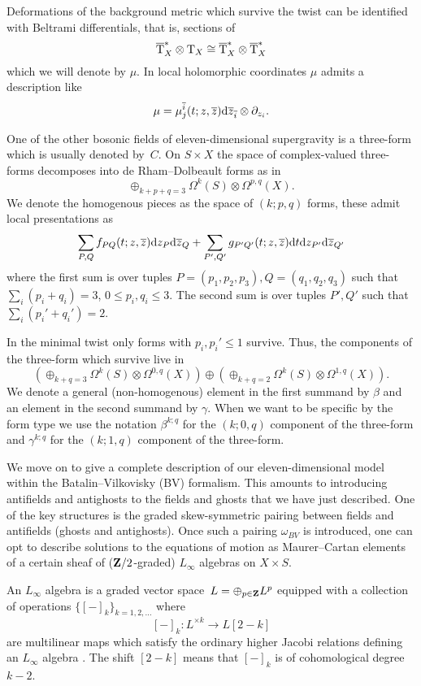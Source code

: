 Deformations of the background metric which survive the twist can be identified with Beltrami differentials, that is, sections of 
\[
\overline{{\rm T}}_X^* \otimes {\rm T}_X \cong \overline{{\rm T}}^*_X \otimes \overline{{\rm T}}_X^* 
\]
which we will denote by $\mu$. 
In local holomorphic coordinates $\mu$ admits a description like
\[
\mu = \mu^{\overline{i}}_j (t;z,\overline{z}) {\rm d} \overline{z}_{\overline{i}} \otimes \partial_{z_i} .
\]

One of the other bosonic fields of eleven-dimensional supergravity is a three-form which is usually denoted by~$C$. 
On $S \times X$ the space of complex-valued three-forms decomposes into de Rham--Dolbeault forms as in
\[
\oplus_{k+p+q=3} \Omega^k(S) \otimes \Omega^{p,q}(X) .
\]
We denote the homogenous pieces as the space of $(k;p,q)$ forms, these admit local presentations as
\[
\sum_{P,Q} f_{PQ} (t;z,\overline{z}) {\rm d} z_P {\rm d} \overline{z}_Q + \sum_{P',Q'} g_{P'Q'}(t;z,\overline{z}) {\rm d} t {\rm d} z_{P'}{\rm d} \overline{z}_{Q'} 
\]
where the first sum is over tuples $P=(p_1,p_2,p_3),Q=(q_1,q_2,q_3)$ such that $\sum_i (p_i + q_i) = 3$, $0 \leq p_i,q_i \leq 3$.
The second sum is over tuples $P',Q'$ such that $\sum_i (p_i'+q_i') = 2$. 

In the minimal twist only forms with $p_i ,p_i'\leq 1$ survive. 
Thus, the components of the three-form which survive live in
\[
\left(\oplus_{k+q = 3} \Omega^k(S) \otimes \Omega^{0,q}(X)\right) \oplus 
\left(\oplus_{k+q = 2} \Omega^k(S) \otimes \Omega^{1,q}(X)\right) .
\]
We denote a general (non-homogenous) element in the first summand by $\beta$ and an element in the second summand by $\gamma$.
When we want to be specific by the form type we use the notation $\beta^{k;q}$ for the $(k;0,q)$ component of the three-form and $\gamma^{k;q}$ for the $(k;1,q)$ component of the three-form.

\parsec[s:Lsugra]

We move on to give a complete description of our eleven-dimensional model within the Batalin--Vilkovisky (BV) formalism.
This amounts to introducing antifields and antighosts to the fields and ghosts that we have just described.
One of the key structures is the graded skew-symmetric pairing between fields and antifields (ghosts and antighosts).
Once such a pairing $\omega_{BV}$ is introduced, one can opt to describe solutions to the equations of motion as Maurer--Cartan elements of a certain sheaf of ($\mathbf{Z}/2$-graded) $L_\infty$ algebras on $X \times S$.

An $L_\infty$ algebra is a graded vector space~$L=\oplus_{p\in \mathbf{Z}} L^p$ equipped with a collection of operations $\{[-]_k\}_{k = 1,2,\ldots}$ where 
\[
[-]_k \colon L^{\times k} \to L[2-k] 
\]
are multilinear maps which satisfy the ordinary higher Jacobi relations defining an $L_\infty$ algebra \cite{??}. 
The shift $[2-k]$ means that $[-]_k$ is of cohomological degree $k-2$. 

